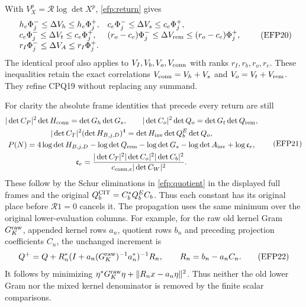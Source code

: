 \documentclass[11pt,a4paper]{article}
\begin{document}
With $V_X^p=\mathcal R\log\det X^p$, \eqref{efp:return} gives
\[
\begin{array}{ll}
h_e\Phi_j^-\le\Delta V_h\le h_e\Phi_j^+,&
c_e\Phi_j^-\le\Delta V_s\le c_e\Phi_j^+,\\
c_e\Phi_j^-\le\Delta V_t\le c_e\Phi_j^+,&
(r_o-c_e)\Phi_j^-\le\Delta V_{\rm rem}\le(r_o-c_e)\Phi_j^+,\\
r_I\Phi_j^-\le\Delta V_A\le r_I\Phi_j^+.&
\end{array}\tag{EFP20}\label{efp:cpq}
\]
The identical proof also applies to $V_I,V_b,V_o,V_{\rm conn}$
with ranks $r_I,r_b,r_o,r_e$. These inequalities retain the exact
correlations
$V_{\rm conn}=V_h+V_s$ and $V_o=V_t+V_{\rm rem}$.
They refine CPQ19 without replacing any summand.

For clarity the absolute frame identities that precede every return
are still
\[
\begin{gathered}
|\det C_P|^2\det H_{\rm conn}=\det G_h\det G_s,\qquad
|\det C_o|^2\det Q_o=\det G_t\det Q_{\rm rem},\\
|\det C_T|^2(\det H_{B,j,D})^4
 =\det H_{\rm inv}\det Q_b^E\det Q_o,\\
P(N)=4\log\det H_{B,j,D}-\log\det Q_{\rm rem}
 -\log\det G_s-\log\det A_{\rm inv}+\log\mathfrak c_e,\\
\mathfrak c_e=
 \frac{|\det C_T|^2|\det C_o|^2|\det C_b|^2}
 {c_{{\rm conn},e}|\det C_W|^2}.
\end{gathered}\tag{EFP21}\label{efp:frames}
\]
These follow by the Schur eliminations in \eqref{efp:quotient} in
the displayed full frames and the original
$Q_b^{\rm CIT}=C_b^*Q_b^EC_b$. Thus each constant has its original
place before $\mathcal R1=0$ cancels it. The propagation uses the
same minimum over the original lower-evaluation columns. For example,
for the raw old kernel Gram $G_K^{\rm raw}$, appended kernel rows $a_n$,
quotient rows $b_n$ and preceding projection coefficients $C_n$,
the unchanged increment is
\[
Q^+=Q+R_n^*(I+a_n(G_K^{\rm raw})^{-1}a_n^*)^{-1}R_n,
\qquad R_n=b_n-a_nC_n .
\tag{EFP22}\label{efp:row}
\]
It follows by minimizing
$\eta^*G_K^{\rm raw}\eta+\|R_nx-a_n\eta\|^2$.
Thus neither the old lower Gram nor the mixed kernel denominator
is removed by the finite scalar comparisons.
\end{document}
